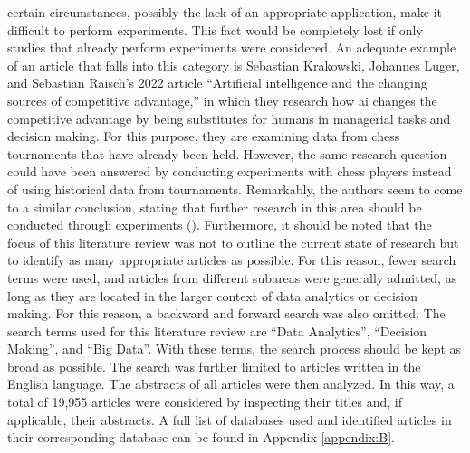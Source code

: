 certain circumstances, possibly the lack of an appropriate application, make it difficult to perform experiments. This fact would be completely lost if only studies that already perform experiments were considered. An adequate example of an article that falls into this category is Sebastian Krakowski, Johannes Luger, and Sebastian Raisch's 2022 article \enquote{Artificial intelligence and the changing sources of competitive advantage,} in which they research how \ac{ai} changes the competitive advantage by being substitutes for humans in managerial tasks and decision making. For this purpose, they are examining data from chess tournaments that have already been held. However, the same research question could have been answered by conducting experiments with chess players instead of using historical data from tournaments. Remarkably, the authors seem to come to a similar conclusion, stating that further research in this area should be conducted through experiments (\cite{Krakowski.2022}). Furthermore, it should be noted that the focus of this literature review was not to outline the current state of research but to identify as many appropriate articles as possible. For this reason, fewer search terms were used, and articles from different subareas were generally admitted, as long as they are located in the larger context of data analytics or decision making. For this reason, a backward and forward search was also omitted.
The search terms used for this literature review are \enquote{Data Analytics}, \enquote{Decision Making}, and \enquote{Big Data}. With these terms, the search process should be kept as broad as possible. The search was further limited to articles written in the English language. The abstracts of all articles were then analyzed. In this way, a total of 19,955 articles were considered by inspecting their titles and, if applicable, their abstracts. A full list of databases used and identified articles in their corresponding database can be found in Appendix \ref{appendix:B}.

